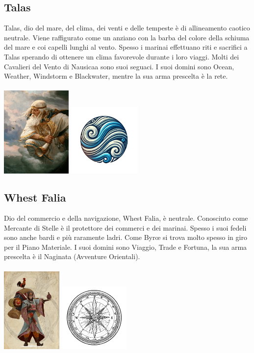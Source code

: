 \documentclass[10pt, a4paper]{report}
\begin{document}
\begin{multicols}{2}
\subsection*{Talas}
Talas, dio del mare, del clima, dei venti e delle tempeste è di allineamento caotico neutrale. Viene raffigurato come un anziano con la barba del colore della schiuma del mare e coi capelli lunghi al vento. Spesso i marinai effettuano riti e sacrifici a Talas sperando di ottenere un clima favorevole durante i loro viaggi. Molti dei Cavalieri del Vento di Nausicaa sono suoi seguaci.
I suoi domini sono Ocean, Weather, Windstorm e Blackwater, mentre la sua arma prescelta è la rete.\\
\\
\includegraphics[width = 3.5cm]{talas.png}
\includegraphics[width = 3.6cm]{talas_simbolo.png}\\
\subsection*{Whest Falia}
Dio del commercio e della navigazione, Whest Falia, è neutrale. Conosciuto come Mercante di Stelle è il protettore dei commerci e dei marinai. Spesso i suoi fedeli sono anche bardi e più raramente ladri. Come Byrœ si trova molto spesso in giro per il Piano Materiale. I suoi domini sono Viaggio, Trade e Fortuna, la sua arma prescelta è il Naginata (Avventure Orientali).\\
\\
\includegraphics[width=3cm]{whestfalia.png}
\includegraphics[width=3.5cm]{whestfalia_simbolo.jpeg}

\end{multicols}
\end{document}
